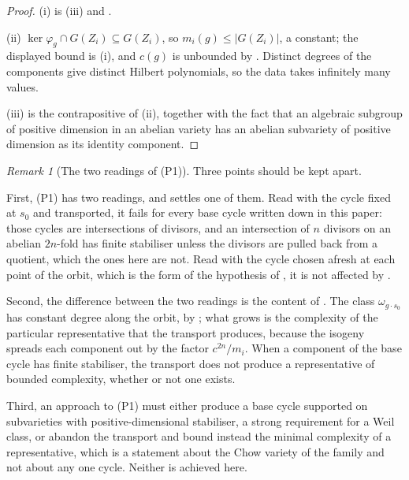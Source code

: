 \documentclass[11pt,reqno]{amsart}
\theoremstyle{plain}
\theoremstyle{definition}
\theoremstyle{remark}
\newtheorem{remark}[theorem]{Remark}
\begin{document}
\begin{proof}
(i) is (iii) and .

(ii) $\ker\varphi_{g}\cap G(Z_{i})\subseteq G(Z_{i})$, so
$m_{i}(g)\le|G(Z_{i})|$, a constant; the displayed bound is (i), and $c(g)$ is
unbounded by . Distinct degrees of the components give
distinct Hilbert polynomials, so the data takes infinitely many values.

(iii) is the contrapositive of (ii), together with the fact that an algebraic
subgroup of positive dimension in an abelian variety has an abelian subvariety
of positive dimension as its identity component.
\end{proof}

\begin{remark}[The two readings of \textup{(P1)}]\label{rem:p1meaning}
Three points should be kept apart.

First, \textup{(P1)} has two readings, and  settles one of
them. Read with the cycle fixed at $s_{0}$ and transported, it fails for every
base cycle written down in this paper: those cycles are intersections of
divisors, and an intersection of $n$ divisors on an abelian $2n$-fold has
finite stabiliser unless the divisors are pulled back from a quotient, which
the ones here are not. Read with the cycle chosen afresh at each point of the
orbit, which is the form of the hypothesis of , it is
not affected by .

Second, the difference between the two readings is the content of
. The class $\omega_{g\cdot s_{0}}$ has constant degree
along the orbit, by ; what grows is the complexity
of the particular representative that the transport produces, because the
isogeny spreads each component out by the factor $c^{2n}/m_{i}$. When a
component of the base cycle has finite stabiliser, the transport does not
produce a representative of bounded complexity, whether or not one exists.

Third, an approach to \textup{(P1)} must either produce a base cycle supported
on subvarieties with positive-dimensional stabiliser, a strong requirement for
a Weil class, or abandon the transport and bound instead the minimal
complexity of a representative, which is a statement about the Chow variety of
the family and not about any one cycle. Neither is achieved here.
\end{remark}
\end{document}
